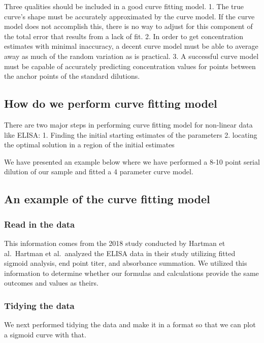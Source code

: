 \documentclass[
]{book}
\begin{document}
Three qualities should be included in a good curve fitting model.
1. The true curve's shape must be accurately approximated by the curve model. If the curve model does not accomplish this, there is no way to adjust for this component of the total error that results from a lack of fit.
2. In order to get concentration estimates with minimal inaccuracy, a decent curve model must be able to average away as much of the random variation as is practical. 3. A successful curve model must be capable of accurately predicting concentration values for points between the anchor points of the standard dilutions.

\subsection{How do we perform curve fitting model}\label{how-do-we-perform-curve-fitting-model}

There are two major steps in performing curve fitting model for non-linear data like ELISA:
1. Finding the initial starting estimates of the parameters
2. locating the optimal solution in a region of the initial estimates

We have presented an example below where we have performed a 8-10 point serial dilution of our sample and fitted a 4 parameter curve model.

\subsection{An example of the curve fitting model}\label{an-example-of-the-curve-fitting-model}

\subsubsection{Read in the data}\label{read-in-the-data}

This information comes from the 2018 study conducted by Hartman et al.~Hartman et al.~analyzed the ELISA data in their study utilizing fitted sigmoid analysis, end point titer, and absorbance summation. We utilized this information to determine whether our formulas and calculations provide the same outcomes and values as theirs.

\subsubsection{Tidying the data}\label{tidying-the-data}

We next performed tidying the data and make it in a format so that we can plot a sigmoid curve with that.
\end{document}
